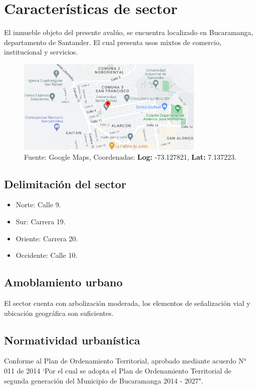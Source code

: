 \documentclass[12pt,a4paper,twoside]{article}
\begin{document}
\section{Características de sector}
El inmueble objeto del presente avalúo, se encuentra localizado en Bucaramanga, departamento de Santander. El cual presenta usos mixtos de comercio, institucional y servicios.

\begin{figure}[h]
	\centering
	\includegraphics[width=0.8\textwidth]{Imagenes/ubicacion1}
	\caption{Fuente: Google Maps, Coordenadas: \textbf{Log:} -73.127821, \textbf{Lat:} 	
		7.137223.}
	\label{fig:mesh1}
\end{figure}

\subsection{Delimitación del sector}

\begin{itemize}
	\item Norte: Calle 9.
	\item Sur: Carrera 19.
	\item Oriente: Carrera 20.
	\item Occidente: Calle 10.
\end{itemize} 

\subsection{Amoblamiento urbano}

El sector cuenta con arbolización moderada, los elementos de señalización vial y ubicación geográfica son suficientes.

\subsection{Normatividad urbanística}

Conforme al Plan de Ordenamiento Territorial, aprobado mediante acuerdo N° 011 de 2014  `Por el cual se adopta el Plan de Ordenamiento Territorial de segunda generación del Municipio de Bucaramanga 2014 - 2027".
\end{document}

